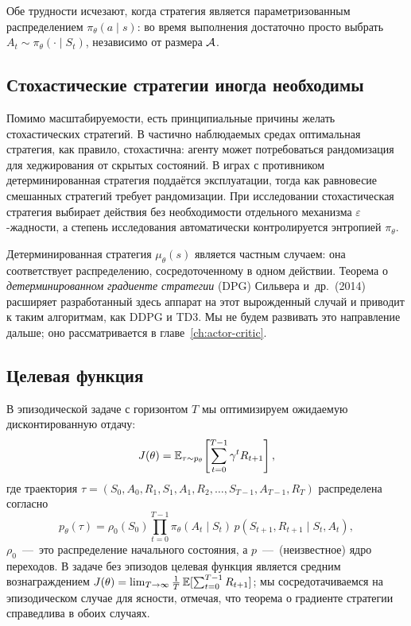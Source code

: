 Обе трудности исчезают, когда стратегия является параметризованным распределением $\pi_\theta(a \mid s)$: во время выполнения достаточно просто выбрать $A_t \sim \pi_\theta(\cdot \mid S_t)$, независимо от размера $\mathcal{A}$.

\subsection{Стохастические стратегии иногда необходимы}

Помимо масштабируемости, есть принципиальные причины желать стохастических стратегий. В частично наблюдаемых средах оптимальная стратегия, как правило, стохастична: агенту может потребоваться рандомизация для хеджирования от скрытых состояний. В играх с противником детерминированная стратегия поддаётся эксплуатации, тогда как равновесие смешанных стратегий требует рандомизации. При исследовании стохастическая стратегия выбирает действия без необходимости отдельного механизма $\varepsilon$-жадности, а степень исследования автоматически контролируется энтропией $\pi_\theta$.

\begin{remark}
Детерминированная стратегия $\mu_\theta(s)$ является частным случаем: она соответствует распределению, сосредоточенному в одном действии. Теорема о \emph{детерминированном градиенте стратегии} (DPG) Сильвера и~др.\  (2014) расширяет разработанный здесь аппарат на этот вырожденный случай и приводит к таким алгоритмам, как DDPG и TD3. Мы не будем развивать это направление дальше; оно рассматривается в главе~\ref{ch:actor-critic}.
\end{remark}

\subsection{Целевая функция}

В эпизодической задаче с горизонтом $T$ мы оптимизируем ожидаемую дисконтированную отдачу:
\begin{equation}
\label{eq:pg-objective}
J(\theta) = \operatorname{\mathbb{E}}_{\tau \sim p_\theta}\!\left[\sum_{t=0}^{T-1} \gamma^t R_{t+1}\right],
\end{equation}
где траектория $\tau = (S_0, A_0, R_1, S_1, A_1, R_2, \ldots, S_{T-1}, A_{T-1}, R_T)$ распределена согласно
\begin{equation}
\label{eq:trajectory-density}
p_\theta(\tau) = \rho_0(S_0)\prod_{t=0}^{T-1} \pi_\theta(A_t \mid S_t)\, p(S_{t+1}, R_{t+1} \mid S_t, A_t),
\end{equation}
$\rho_0$ \,---\, это распределение начального состояния, а $p$ \,---\, (неизвестное) ядро переходов. В задаче без эпизодов целевая функция является средним вознаграждением $J(\theta) = \lim_{T\to\infty} \frac{1}{T}\operatorname{\mathbb{E}}[\sum_{t=0}^{T-1} R_{t+1}]$; мы сосредотачиваемся на эпизодическом случае для ясности, отмечая, что теорема о градиенте стратегии справедлива в обоих случаях.

